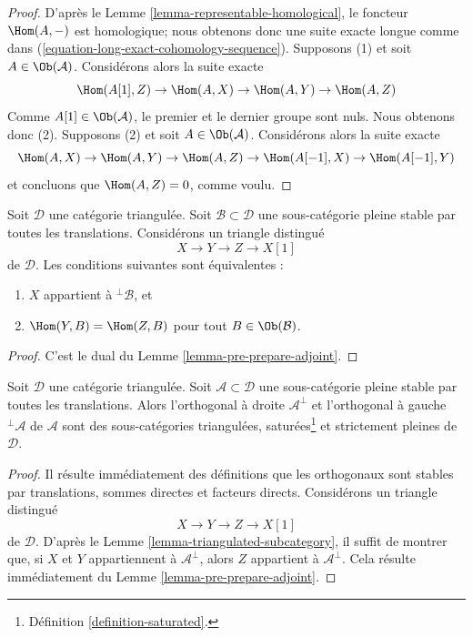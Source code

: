\begin{proof}
D'après le Lemme \ref{lemma-representable-homological}, le foncteur
$\Hom(A, -)$ est homologique; nous obtenons donc une suite exacte longue comme
dans (\ref{equation-long-exact-cohomology-sequence}).
Supposons (1) et soit $A \in \Ob(\mathcal{A})$.
Considérons alors la suite exacte
$$
\Hom(A[1], Z) \to \Hom(A, X) \to \Hom(A, Y) \to \Hom(A, Z)
$$
Comme $A[1] \in \Ob(\mathcal{A})$, le premier et le dernier groupe sont nuls.
Nous obtenons donc (2). Supposons (2) et soit
$A \in \Ob(\mathcal{A})$. Considérons alors la suite exacte
$$
\Hom(A, X) \to \Hom(A, Y) \to \Hom(A, Z) \to \Hom(A[-1], X) \to \Hom(A[-1], Y)
$$
et concluons que $\Hom(A, Z) = 0$, comme voulu.
\end{proof}

\begin{lemma}
\label{lemma-pre-prepare-adjoint-dual}
Soit $\mathcal{D}$ une catégorie triangulée.
Soit $\mathcal{B} \subset \mathcal{D}$ une sous-catégorie pleine stable par
toutes les translations. Considérons un triangle distingué
$$
X \to Y \to Z \to X[1]
$$
de $\mathcal{D}$. Les conditions suivantes sont équivalentes :
\begin{enumerate}
\item $X$ appartient à ${}^\perp\mathcal{B}$, et
\item $\Hom(Y, B) = \Hom(Z, B)$ pour tout $B \in \Ob(\mathcal{B})$.
\end{enumerate}
\end{lemma}

\begin{proof}
C'est le dual du Lemme \ref{lemma-pre-prepare-adjoint}.
\end{proof}

\begin{lemma}
\label{lemma-orthogonal-triangulated}
Soit $\mathcal{D}$ une catégorie triangulée. Soit
$\mathcal{A} \subset \mathcal{D}$ une sous-catégorie pleine stable par toutes
les translations. Alors l'orthogonal à droite $\mathcal{A}^\perp$ et
l'orthogonal à gauche ${}^\perp\mathcal{A}$ de $\mathcal{A}$ sont des
sous-catégories triangulées, saturées\footnote{Définition
\ref{definition-saturated}.} et strictement pleines de $\mathcal{D}$.
\end{lemma}

\begin{proof}
Il résulte immédiatement des définitions que les orthogonaux sont stables par
translations, sommes directes et facteurs directs.
Considérons un triangle distingué
$$
X \to Y \to Z \to X[1]
$$
de $\mathcal{D}$. D'après le Lemme \ref{lemma-triangulated-subcategory}, il
suffit de montrer que, si $X$ et $Y$ appartiennent à $\mathcal{A}^\perp$,
alors $Z$ appartient à $\mathcal{A}^\perp$. Cela résulte immédiatement du
Lemme \ref{lemma-pre-prepare-adjoint}.
\end{proof}

